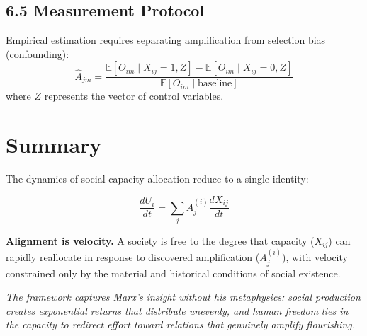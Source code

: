 \documentclass{article}
\begin{document}
\subsection*{6.5 Measurement Protocol}
Empirical estimation requires separating amplification from selection bias (confounding):
\begin{equation}
\hat{A}_{jm} = \frac{\mathbb{E}[O_{im} \mid X_{ij}=1, Z] - \mathbb{E}[O_{im} \mid X_{ij}=0, Z]}{\mathbb{E}[O_{im} \mid \text{baseline}]}
\end{equation}
where $Z$ represents the vector of control variables.

\section*{Summary}

The dynamics of social capacity allocation reduce to a single identity:

\begin{equation}
\boxed{\frac{dU_i}{dt} = \sum_j A_j^{(i)} \frac{dX_{ij}}{dt}}
\end{equation}

\textbf{Alignment is velocity.} A society is free to the degree that capacity ($X_{ij}$) can rapidly reallocate in response to discovered amplification ($A_j^{(i)}$), with velocity constrained only by the material and historical conditions of social existence.

\vspace{1em}

\noindent
\textit{The framework captures Marx's insight without his metaphysics: social production creates exponential returns that distribute unevenly, and human freedom lies in the capacity to redirect effort toward relations that genuinely amplify flourishing.}
\end{document}
